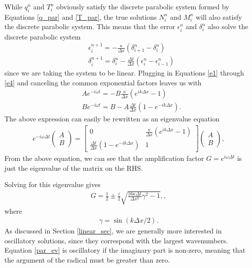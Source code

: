 \documentclass[iop]{emulateapj}
\begin{document}
				While $q_i^n$ and $T_i^n$ obviously satisfy the discrete parabolic system formed by Equations \ref{q_par} and \ref{T_par}, the true solutions $N_i^n$ and $M_i^n$ will also satisfy the discrete parabolic system. This means that the error $\epsilon_i^n$ and $\delta_i^n$ also solve the discrete parabolic system 
				\begin{align}
					& \epsilon_i^{n+1} = - \frac{\kappa}{\Delta x} \left( \delta_{i+1}^n - \delta_{i}^n \right) \\
					& \delta_i^{n+1} = \delta_i^n - \frac{\Delta t}{\Delta x} \left( \epsilon_i^n - \epsilon_{i-1}^n \right)
				\end{align}
				since we are taking the system to be linear. Plugging in Equations \ref{e1} through \ref{e4} and canceling the common exponential factors leaves us with
				\begin{align}
					& A e^{-i \omega t} = - B \frac{\kappa}{\Delta x} \left( e^{i k \Delta x} - 1 \right) \\
					& B e^{-i \omega t} = B - A \frac{\Delta t}{\Delta x} \left( 1 - e^{-i k \Delta x} \right).
				\end{align}
				The above expression can easily be rewritten as an eigenvalue equation
				\begin{align}
					e^{-i \omega \Delta t} \begin{pmatrix}
					A \\
					B
					\end{pmatrix} = \begin{bmatrix}
						0 & \frac{\kappa}{\Delta x} \left( e^{i k \Delta x} - 1 \right) \\
						\frac{\Delta t}{\Delta x} \left( 1 - e^{-i k \Delta x} \right) & 1
					\end{bmatrix}
					\begin{pmatrix}
					A \\
					B
					\end{pmatrix}, \label{par_mat}
				\end{align}
				From the above equation, we can see that the amplification factor $G = e^{i \omega \Delta t}$ is just the eigenvalue of the matrix on the \ac{RHS}.
				
				Solving for this eigenvalue gives
				\begin{align}
				G = \frac{1}{2} \pm \frac{i}{2} \sqrt{\frac{16 \kappa \Delta t}{\Delta x^2} \gamma^2  - 1}, \label{par_ev},
				\end{align}
				where
				\begin{align}
					\gamma = \sin(k \Delta x / 2).
				\end{align}
				As discussed in Section \ref{linear_sec}, we are generally more interested in oscillatory solutions, since they correspond with the largest wavenumbers.
				Equation \ref{par_ev} is oscillatory if the imaginary part is non-zero, meaning that the argument of the radical must be greater than zero.
\end{document}
